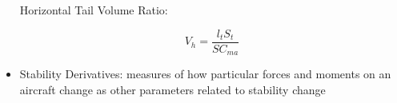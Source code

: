 \documentclass{journal}
\begin{document}
\begin{itemize}
		\subitem Horizontal Tail Volume Ratio:
		
		\begin{equation}
			V_h = \frac{l_tS_t}{SC_{ma}}
			\label{eqn:htail-ratio-wiki}
		\end{equation}
	
		\item Stability Derivatives: measures of how particular forces and moments on an aircraft change as other parameters related to stability change
		
	\end{itemize}
	
	
\end{document}
